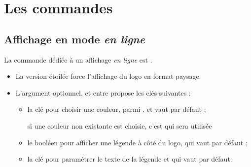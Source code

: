 \documentclass[french,11pt,a4paper]{article}
\begin{document}
\begin{demohigh}[language=latex/latex3,style/main=cyan!10,style/code=cyan!10,style/demo=cyan!10]
\affloetalab
\end{demohigh}

\begin{demohigh}[language=latex/latex3,style/main=cyan!10,style/code=cyan!10,style/demo=cyan!10]
\affloetalab*
\end{demohigh}

\begin{demohigh}[language=latex/latex3,style/main=cyan!10,style/code=cyan!10,style/demo=cyan!10]
\loetalab\loetalab*\affloetalab\affloetalab*
\end{demohigh}

\section{Les commandes}

\subsection{Affichage en mode \textit{en ligne}}

La commande dédiée à un affichage \textit{en ligne} est .

\medskip

\begin{itemize}[leftmargin=*]
	\item La version étoilée force l'affichage du logo en format paysage.
	\item L'argument optionnel, et entre \MontreCode{[...]} propose les clés suivantes :
	\begin{itemize}
		\item la clé  pour choisir une couleur, parmi , et vaut  par défaut ;
		
		\hfill{\footnotesize si une couleur non existante est choisie, c'est  qui sera utilisée}
		\item le booléen  pour afficher une légende à côté du logo, qui vaut  par défaut ;
		\item la clé  pour paramétrer le texte de la légende et qui vaut  par défaut.
	\end{itemize}
\end{itemize}
\end{document}
